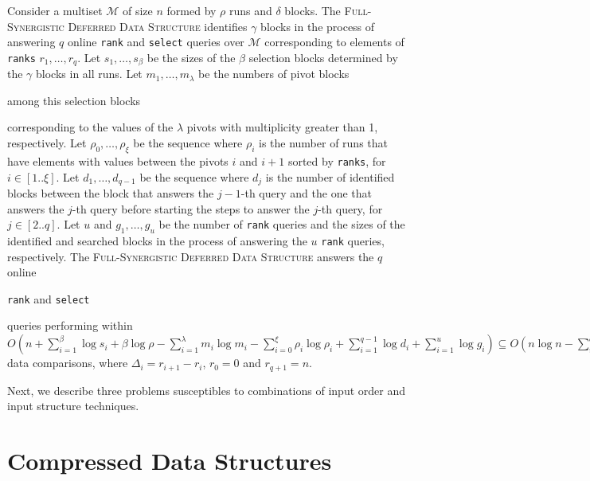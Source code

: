 \begin{theorem}\label{theo:finger}
  Consider a multiset $\mathcal{M}$ of size $n$ formed by $\rho$ runs and
  $\delta$ blocks. The \textsc{Full-Synergistic Deferred Data
    Structure} identifies $\gamma$ blocks in the process of answering
  $q$ online \texttt{rank} and \texttt{select} queries over
  $\mathcal{M}$ corresponding to elements of \texttt{ranks} $r_1,
  \dots, r_q$. Let $s_1, \dots, s_{\beta}$ be the sizes of the $\beta$
  selection blocks determined by the $\gamma$ blocks in all runs.
  Let
  $m_1, \dots, m_\lambda$ be the numbers of pivot blocks
  \begin{LONG}
    among this selection blocks
  \end{LONG}
  corresponding to the values of the $\lambda$ pivots with
  multiplicity greater than 1, respectively.  Let
  $\rho_0, \dots, \rho_\xi$ be the sequence where $\rho_i$ is the
  number of runs that have elements with values between the pivots $i$
  and $i+1$ sorted by \texttt{ranks}, for $i\in[1..\xi]$.  Let
  $d_1, \dots, d_{q-1}$ be the sequence where $d_j$ is the number
  of identified blocks between the block that answers the $j-1$-th
  query and the one that answers the $j$-th query before starting the
  steps to answer the $j$-th query, for $j\in[2..q]$. Let $u$ and
  $g_1, \dots, g_u $ be the number of \texttt{rank} queries and the
  sizes of the identified and searched blocks in the process of
  answering the $u$ \texttt{rank} queries, respectively. The
  \textsc{Full-Synergistic Deferred Data Structure} answers the $q$
  online
  \begin{LONG}
    \texttt{rank} and \texttt{select}
  \end{LONG}
queries performing within
  $O(n + \sum^{\beta}_{i=1}\log{s_i} + \beta\log{\rho} -
  \sum^{\lambda}_{i=1}m_i\log{m_i} -
  \sum^{\xi}_{i=0}\rho_i\log{\rho_i} + \sum^{q-1}_{i=1}\log{d_i} +
  \sum^{u}_{i=1}\log{g_i}) \subseteq O\left(n\log{n} -
    \sum^{q}_{i=0}\Delta_i\log{\Delta_i} + q\log{n}\right)$ data
  comparisons, where $\Delta_i = r_{i+1} - r_i$, $r_0=0$ and $r_{q+1}=n$.
\end{theorem}

Next, we describe three problems susceptibles to combinations of input
order and input structure techniques.

\section{Compressed Data Structures}
\label{sec:compressed}

